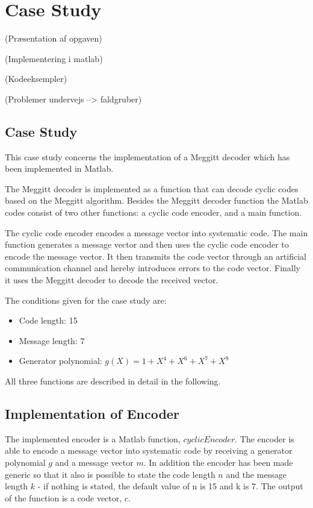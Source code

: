 \documentclass[Main]{subfiles}
\begin{document}
\section{Case Study}

(Præsentation af opgaven)

(Implementering i matlab)

(Kodeeksempler)

(Problemer undervejs --> faldgruber)

\subsection{Case Study}
This case study concerns the implementation of a Meggitt decoder which has been implemented in Matlab. 

\noindent The Meggitt decoder is implemented as a function that can decode cyclic codes based on the Meggitt algorithm. Besides the Meggitt decoder function the Matlab codes consist of two other functions: a cyclic code encoder, and a main function.

\noindent The cyclic code encoder encodes a message vector into systematic code. The main function generates a message vector and then uses the cyclic code encoder to encode the message vector. It then transmits the code vector through an artificial communication channel and hereby introduces errors to the code vector. Finally it uses the Meggitt decoder to decode the received vector. 

\noindent The conditions given for the case study are: 
\begin{itemize} \itemsep0pt \parskip0pt 
\item Code length: 15
\item Message length: 7
\item Generator polynomial: $g(X)=1+X^4+X^6+X^7+X^8$
\end{itemize} 

\noindent All three functions are described in detail in the following. 


\subsection{Implementation of Encoder}
The implemented encoder is a Matlab function, $cyclicEncoder$. The encoder is able to encode a message vector into systematic code by receiving a generator polynomial $g$ and a message vector $m$. In addition the encoder has been made generic so that it also is possible to state the code length $n$ and the message length $k$ - if nothing is stated, the default value of n is 15 and k is 7. The output of the function is a code vector, $c$. 
\end{document}
